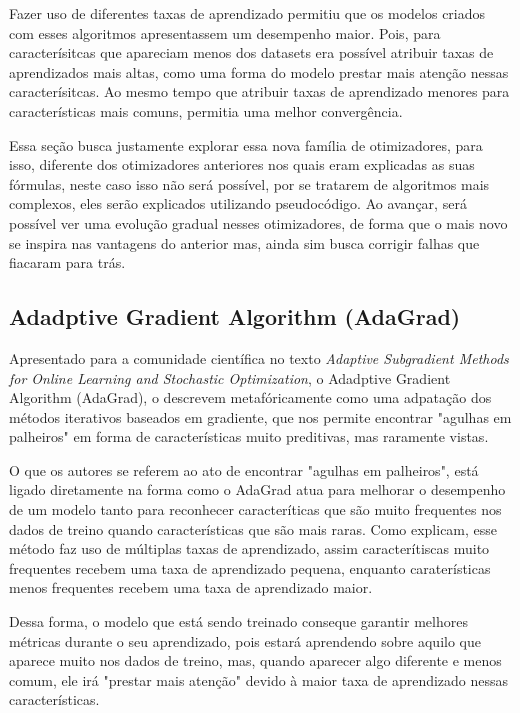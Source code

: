Fazer uso de diferentes taxas de aprendizado permitiu que os modelos criados com esses algoritmos apresentassem um desempenho maior. Pois, para caracterísitcas que apareciam menos dos datasets era possível atribuir taxas de aprendizados mais altas, como uma forma do modelo prestar mais atenção nessas caracterísitcas. Ao mesmo tempo que atribuir taxas de aprendizado menores para características mais comuns, permitia uma melhor convergência.

Essa seção busca justamente explorar essa nova família de otimizadores, para isso, diferente dos otimizadores anteriores nos quais eram explicadas as suas fórmulas, neste caso isso não será possível, por se tratarem de algoritmos mais complexos, eles serão explicados utilizando pseudocódigo. Ao avançar, será possível ver uma evolução gradual nesses otimizadores, de forma que o mais novo se inspira nas vantagens do anterior mas, ainda sim busca corrigir falhas que fiacaram para trás.

\subsection{Adadptive Gradient Algorithm (AdaGrad)}

Apresentado para a comunidade científica no texto \textit{Adaptive Subgradient Methods for Online Learning and Stochastic Optimization}, o Adadptive Gradient Algorithm (AdaGrad), \textcite{AdaGradMethod} o descrevem metafóricamente como uma adpatação dos métodos iterativos baseados em gradiente, que nos permite encontrar "agulhas em palheiros" em forma de características muito preditivas, mas raramente vistas.

O que os autores se referem ao ato de encontrar "agulhas em palheiros", está ligado diretamente na forma como o AdaGrad atua para melhorar o desempenho de um modelo tanto para reconhecer caracteríticas que são muito frequentes nos dados de treino quando características que são mais raras. Como \textcite{AdaGradMethod} explicam, esse método faz uso de múltiplas taxas de aprendizado, assim caracterítiscas muito frequentes recebem uma taxa de aprendizado pequena, enquanto caraterísticas menos frequentes recebem uma taxa de aprendizado maior.

Dessa forma, o modelo que está sendo treinado conseque garantir melhores métricas durante o seu aprendizado, pois estará aprendendo sobre aquilo que aparece muito nos dados de treino, mas, quando aparecer algo diferente e menos comum, ele irá "prestar mais atenção" devido à maior taxa de aprendizado nessas características.

